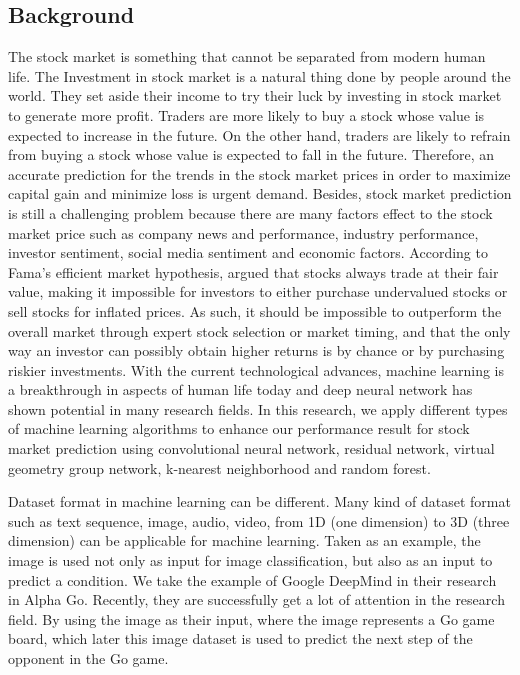 \documentclass[10pt,twocolumn]{article}
\begin{document}
\subsection{Background}
The stock market is something that cannot be separated from modern human life. The Investment in stock market is a natural thing done by people around the world. They set aside their income to try their luck by investing in stock market to generate more profit. Traders are more likely to buy a stock whose value is expected to increase in the future. On the other hand, traders are likely to refrain from buying a stock whose value is expected to fall in the future. Therefore, an accurate prediction for the trends in the stock market prices in order to maximize capital gain and minimize loss is urgent demand. Besides, stock market prediction is still a challenging problem because there are many factors effect to the stock market price such as company news and performance, industry performance, investor sentiment, social media sentiment and economic factors. According to Fama’s efficient market hypothesis, argued that stocks always trade at their fair value, making it impossible for investors to either purchase undervalued stocks or sell stocks for inflated prices\cite{malkiel1970efficient}. As such, it should be impossible to outperform the overall market through expert stock selection or market timing, and that the only way an investor can possibly obtain higher returns is by chance or by purchasing riskier investments. With the current technological advances, machine learning is a breakthrough in aspects of human life today and deep neural network has shown potential in many research fields. In this research, we apply different types of machine learning algorithms to enhance our performance result for stock market prediction using convolutional neural network, residual network, virtual geometry group network, k-nearest neighborhood and random forest.
\par
Dataset format in machine learning can be different. Many kind of dataset format such as text sequence, image, audio, video, from 1D (one dimension) to 3D (three dimension) can be applicable for machine learning. Taken as an example, the image is used not only as input for image classification, but also as an input to predict a condition. We take the example of Google DeepMind in their research in Alpha Go\cite{he2016deep}. Recently, they are successfully get a lot of attention in the research field. By using the image as their input, where the image represents a Go game board, which later this image dataset is used to predict the next step of the opponent in the Go game.
\end{document}
